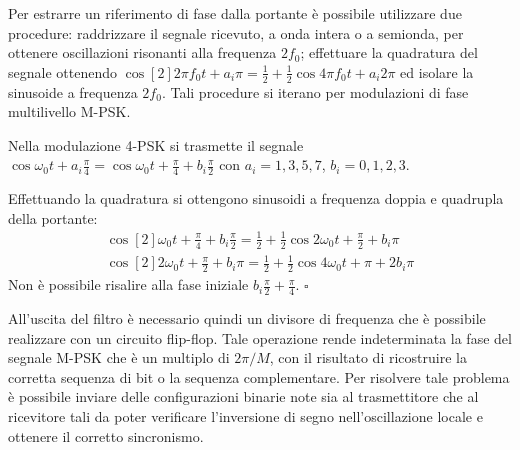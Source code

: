 Per estrarre un riferimento di fase dalla portante è possibile utilizzare due procedure: raddrizzare il segnale ricevuto, a onda intera o a semionda, per ottenere oscillazioni risonanti alla frequenza $2f_0$; effettuare la quadratura del segnale ottenendo $\cos[2]{2\pi f_0 t+a_i\pi}=\frac{1}{2}+\frac{1}{2}\cos{4\pi f_0 t+a_i 2\pi}$ ed isolare la sinusoide a frequenza $2f_0$. Tali procedure si iterano per modulazioni di fase multilivello M-\ac{PSK}. 

\begin{esempio}
Nella modulazione 4-\ac{PSK} si trasmette il segnale $\cos{\omega_0 t+a_i\frac{\pi}{4}}=\cos{\omega_0 t+\frac{\pi}{4}+b_i\frac{\pi}{2}}$ con $a_i=1,3,5,7$, $b_i=0,1,2,3$.

Effettuando la quadratura si ottengono sinusoidi a frequenza doppia e quadrupla della portante:
\[\begin{split}\cos[2]{\omega_0 t+\frac{\pi}{4}+b_i\frac{\pi}{2}}=\frac{1}{2}+\frac{1}{2}\cos{2\omega_0 t+\frac{\pi}{2}+b_i\pi} \\ \cos[2]{2\omega_0 t+\frac{\pi}{2}+b_i\pi}=\frac{1}{2}+\frac{1}{2}\cos{4\omega_0 t+\pi+2b_i\pi}\end{split}\]
Non è possibile risalire alla fase iniziale $b_i\frac{\pi}{2}+\frac{\pi}{4}$. $\square$
\end{esempio}

All'uscita del filtro è necessario quindi un divisore di frequenza che è possibile realizzare con un circuito flip-flop. Tale operazione rende indeterminata la fase del segnale M-\ac{PSK} che è un multiplo di $2\pi/M$, con il risultato di ricostruire la corretta sequenza di bit o la sequenza complementare. Per risolvere tale problema è possibile inviare delle configurazioni binarie note sia al trasmettitore che al ricevitore tali da poter verificare l'inversione di segno  nell'oscillazione locale e ottenere il corretto sincronismo.

